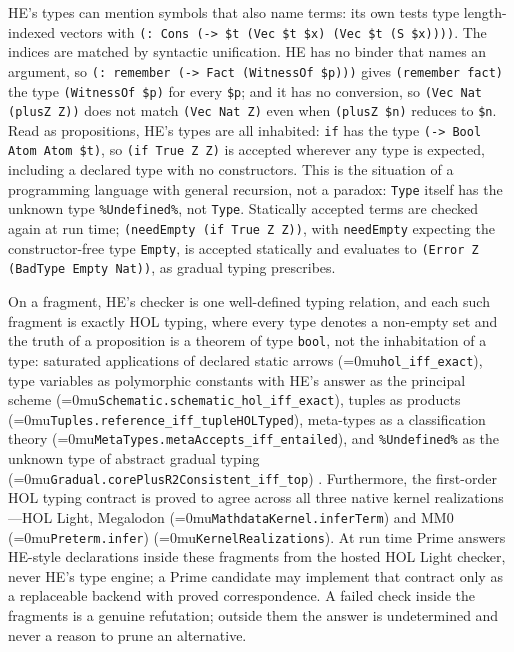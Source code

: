 \documentclass[11pt]{article}
\newcommand{\leanname}[1]{\textup{\Urlmuskip=0mu\relax\nolinkurl{#1}}}
\theoremstyle{definition}
\theoremstyle{remark}
\newcommand{\code}[1]{\texttt{#1}}
\begin{document}
HE's types can mention symbols that also name terms: its own tests type
length-indexed vectors with \code{(: Cons (-> \$t (Vec \$t \$x) (Vec \$t (S \$x))))}.
The indices are matched by syntactic unification. HE has no binder that names an
argument, so \code{(: remember (-> Fact (WitnessOf \$p)))} gives
\code{(remember fact)} the type \code{(WitnessOf \$p)} for every \code{\$p};
and it has no conversion, so \code{(Vec Nat (plusZ Z))} does not match
\code{(Vec Nat Z)} even when \code{(plusZ \$n)} reduces to \code{\$n}. Read as
propositions, HE's types are all inhabited: \code{if} has the type
\code{(-> Bool Atom Atom \$t)}, so \code{(if True Z Z)} is accepted wherever any
type is expected, including a declared type with no constructors. This is the
situation of a programming language with general recursion, not a paradox:
\code{Type} itself has the unknown type \code{\%Undefined\%}, not \code{Type}.
Statically accepted terms are checked again at run time; \code{(needEmpty (if
True Z Z))}, with \code{needEmpty} expecting the constructor-free type
\code{Empty}, is accepted statically and evaluates to
\code{(Error Z (BadType Empty Nat))}, as gradual typing prescribes.

On a fragment, HE's checker is one well-defined typing relation, and each such
fragment is exactly HOL typing, where every type denotes a non-empty set and the
truth of a proposition is a theorem of type \code{bool}, not the inhabitation of
a type: saturated applications of declared static arrows
(\leanname{hol_iff_exact}), type variables as polymorphic constants with HE's
answer as the principal scheme (\leanname{Schematic.schematic_hol_iff_exact}),
tuples as products (\leanname{Tuples.reference_iff_tupleHOLTyped}), meta-types
as a classification theory (\leanname{MetaTypes.metaAccepts_iff_entailed}), and
\code{\%Undefined\%} as the unknown type of abstract gradual typing
(\leanname{Gradual.corePlusR2Consistent_iff_top}) \cite{GarciaClarkTanterAGT}.
Furthermore, the first-order HOL typing contract is proved to agree across all
three native kernel realizations---HOL Light, Megalodon
(\leanname{MathdataKernel.inferTerm}) and MM0 (\leanname{Preterm.infer})
(\leanname{KernelRealizations}).
At run time Prime answers HE-style declarations inside these fragments from the
hosted HOL Light checker, never HE's type engine; a Prime candidate may
implement that contract only as a replaceable backend with proved
correspondence. A failed check inside the
fragments is a genuine refutation; outside them the answer is undetermined and
never a reason to prune an alternative.
\end{document}
